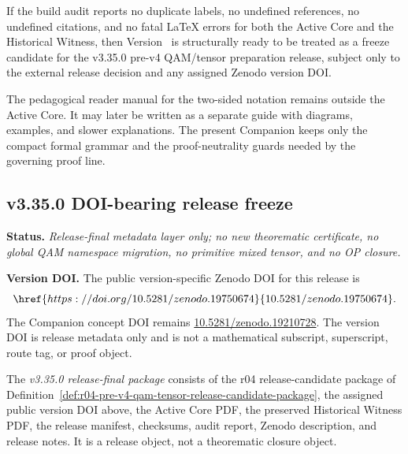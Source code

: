 \begin{corollary}
\label{cor:r04-freeze-readiness-condition}
If the build audit reports no duplicate labels, no undefined references, no undefined citations, and no fatal LaTeX errors for both the Active Core and the Historical Witness, then Version~\docversion{} is structurally ready to be treated as a freeze candidate for the v3.35.0 pre-v4 QAM/tensor preparation release, subject only to the external release decision and any assigned Zenodo version DOI.
\end{corollary}

\begin{remark}
\label{rem:r04-reader-manual-separation}
The pedagogical reader manual for the two-sided notation remains outside the Active Core.  It may later be written as a separate guide with diagrams, examples, and slower explanations.  The present Companion keeps only the compact formal grammar and the proof-neutrality guards needed by the governing proof line.
\end{remark}



\subsection*{v3.35.0 DOI-bearing release freeze}
\label{subsec:v3350-doi-bearing-release-freeze}

\noindent\textbf{Status.} \emph{Release-final metadata layer only; no new theorematic certificate, no global QAM namespace migration, no primitive mixed tensor, and no OP closure.}\par
\noindent\textbf{Version DOI.} The public version-specific Zenodo DOI for this release is
\[
  \href{https://doi.org/10.5281/zenodo.19750674}{10.5281/zenodo.19750674}.
\]
The Companion concept DOI remains \href{https://doi.org/10.5281/zenodo.19210728}{10.5281/zenodo.19210728}. The version DOI is release metadata only and is not a mathematical subscript, superscript, route tag, or proof object.

\begin{definition}
\label{def:v3350-release-final-package}
The \emph{v3.35.0 release-final package} consists of the r04 release-candidate package of Definition~\ref{def:r04-pre-v4-qam-tensor-release-candidate-package}, the assigned public version DOI above, the Active Core PDF, the preserved Historical Witness PDF, the release manifest, checksums, audit report, Zenodo description, and release notes.  It is a release object, not a theorematic closure object.
\end{definition}

